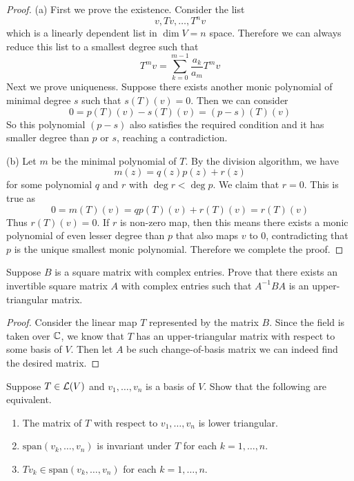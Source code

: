 \documentclass{extarticle}
\begin{document}
\begin{proof}
(a) First we prove the existence. Consider the list 
\[v, Tv, \ldots, T^n v\] 
which is a linearly dependent list in \(\dim V = n\) space. Therefore we can always reduce this list 
to a smallest degree such that 
\[T^m v = \sum_{k=0}^{m-1}\frac{a_k}{a_m}T^m v\]
Next we prove uniqueness. Suppose there exists another monic polynomial of minimal degree 
\(s\) such that \(s(T)(v) = 0\). Then we can consider 
\[0 = p(T)(v) - s(T)(v) = (p - s)(T)(v)\]
So this polynomial \((p - s)\) also satisfies the required condition and it has smaller degree 
than \(p\) or \(s\), reaching a contradiction. 

(b) Let \(m\) be the minimal polynomial of \(T\). By the division algorithm, we have 
\[m(z) = q(z)p(z) + r(z)\]
for some polynomial \(q\) and \(r\) with \(\deg r < \deg p\). We claim that \(r = 0\). This is true as 
\[0 = m(T)(v) = qp(T)(v) + r(T)(v) = r(T)(v)\]
Thus \(r(T)(v) = 0\). If \(r\) is non-zero map, then this means there exists a monic polynomial of even 
lesser degree than \(p\) that also maps \(v\) to 0, 
contradicting that \(p\) is the unique smallest monic polynomial. Therefore we complete the proof.
\end{proof}

\begin{problem}{9}
    Suppose \(B\) is a square matrix with complex entries. Prove that there exists an invertible square 
    matrix \(A\) with complex entries such that \(A^{-1}BA\) is an upper-triangular matrix.
\end{problem}

\begin{proof}
Consider the linear map \(T\) represented by the matrix \(B\). Since the field is taken over \(\mathbb{C}\), we know 
that \(T\) has an upper-triangular matrix with respect to some basis of \(V\). Then let \(A\) be such 
change-of-basis matrix we can indeed find the desired matrix. 
\end{proof}

\begin{problem}{10}
    Suppose \(T \in \mathcal{L}(V)\) and \(v_1, \ldots, v_n\) is a basis of \(V\). Show that the following are 
    equivalent. 

    \begin{enumerate}[label=(\alph*)]
        \item The matrix of \(T\) with respect to \(v_1, \ldots, v_n\) is lower triangular. 
        \item \(\text{span}(v_k, \ldots, v_n)\) is invariant under \(T\) for each \(k = 1, \ldots, n\). 
        \item \(Tv_k \in \text{span}(v_k, \ldots, v_n)\) for each \(k = 1, \ldots, n\).
    \end{enumerate}
\end{problem}
\end{document}
